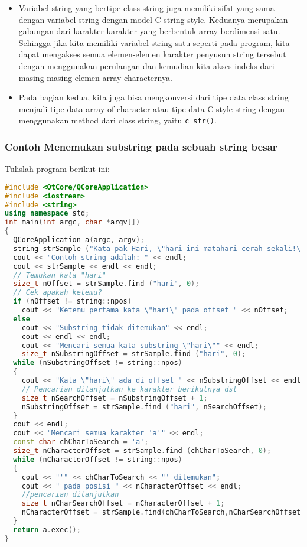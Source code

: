 \begin{itemize}

\item
  Variabel string yang bertipe class string juga memiliki sifat yang
  sama dengan variabel string dengan model C-string style. Keduanya
  merupakan gabungan dari karakter-karakter yang berbentuk array
  berdimensi satu. Sehingga jika kita memiliki variabel string satu
  seperti pada program, kita dapat mengakses semua elemen-elemen
  karakter penyusun string tersebut dengan menggunakan perulangan dan
  kemudian kita akses indeks dari masing-masing elemen array
  characternya.
\item
  Pada bagian kedua, kita juga bisa mengkonversi dari tipe data class
  string menjadi tipe data array of character atau tipe data C-style
  string dengan menggunakan method dari class string, yaitu
  \texttt{c\_str()}.
\end{itemize}

\subsubsection*{Contoh  Menemukan substring pada sebuah string besar}

Tulislah program berikut ini:

\begin{lstlisting}[language=c++, caption=Menemukan substring pada sebuah string besar, label=contoh3-29]
#include <QtCore/QCoreApplication>
#include <iostream>
#include <string>
using namespace std;
int main(int argc, char *argv[])
{
  QCoreApplication a(argc, argv);
  string strSample ("Kata pak Hari, \"hari ini matahari cerah sekali!\"");
  cout << "Contoh string adalah: " << endl;
  cout << strSample << endl << endl;
  // Temukan kata "hari"
  size_t nOffset = strSample.find ("hari", 0);
  // Cek apakah ketemu?
  if (nOffset != string::npos)
    cout << "Ketemu pertama kata \"hari\" pada offset " << nOffset;
  else
    cout << "Substring tidak ditemukan" << endl;
    cout << endl << endl;
    cout << "Mencari semua kata substring \"hari\"" << endl;
    size_t nSubstringOffset = strSample.find ("hari", 0);
  while (nSubstringOffset != string::npos)
  {
    cout << "Kata \"hari\" ada di offset " << nSubstringOffset << endl;
    // Pencarian dilanjutkan ke karakter berikutnya dst
    size_t nSearchOffset = nSubstringOffset + 1;
    nSubstringOffset = strSample.find ("hari", nSearchOffset);
  }
  cout << endl;
  cout << "Mencari semua karakter 'a'" << endl;
  const char chCharToSearch = 'a';
  size_t nCharacterOffset = strSample.find (chCharToSearch, 0);
  while (nCharacterOffset != string::npos)
  {
    cout << "'" << chCharToSearch << "' ditemukan";
    cout << " pada posisi " << nCharacterOffset << endl;
    //pencarian dilanjutkan
    size_t nCharSearchOffset = nCharacterOffset + 1;
    nCharacterOffset = strSample.find(chCharToSearch,nCharSearchOffset);
  }
  return a.exec();
}
\end{lstlisting}

